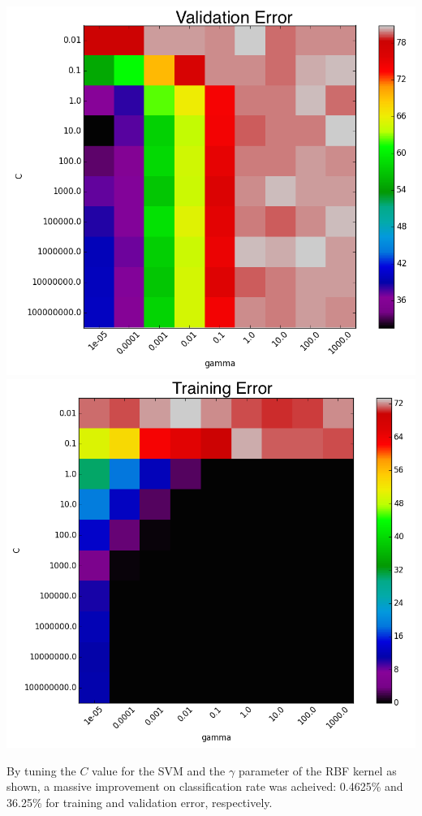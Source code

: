 \documentclass[12pt]{article}
\begin{document}
\includegraphics[scale=0.35]{../figures/val_c_gamma_chart.png}
\includegraphics[scale=0.335]{../figures/train_c_gamma_chart.png}

By tuning the $C$ value for the SVM and the $\gamma$ parameter of the
RBF kernel as shown, a massive improvement on classification rate was
acheived: 0.4625\% and 36.25\% for training and validation error,
respectively.
\end{document}
